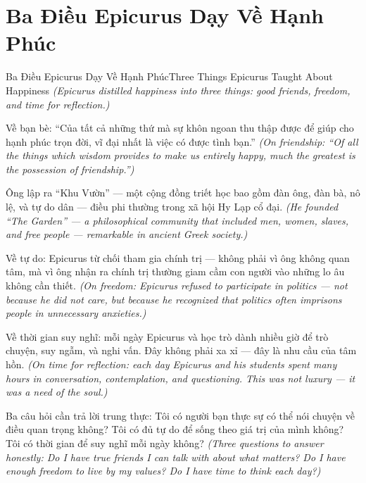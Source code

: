 \section{Ba Điều Epicurus Dạy Về Hạnh Phúc}
\begin{truyen}{Ba Điều Epicurus Dạy Về Hạnh Phúc}{Three Things Epicurus Taught About Happiness}
\textit{(Epicurus distilled happiness into three things: good friends, freedom, and time for reflection.)}

Về bạn bè: ``Của tất cả những thứ mà sự khôn ngoan thu thập được để giúp cho hạnh phúc trọn đời, vĩ đại nhất là việc có được tình bạn.''
\textit{(On friendship: ``Of all the things which wisdom provides to make us entirely happy, much the greatest is the possession of friendship.'')}

Ông lập ra ``Khu Vườn'' — một cộng đồng triết học bao gồm đàn ông, đàn bà, nô lệ, và tự do dân — điều phi thường trong xã hội Hy Lạp cổ đại.
\textit{(He founded ``The Garden'' — a philosophical community that included men, women, slaves, and free people — remarkable in ancient Greek society.)}

Về tự do: Epicurus từ chối tham gia chính trị — không phải vì ông không quan tâm, mà vì ông nhận ra chính trị thường giam cầm con người vào những lo âu không cần thiết.
\textit{(On freedom: Epicurus refused to participate in politics — not because he did not care, but because he recognized that politics often imprisons people in unnecessary anxieties.)}

Về thời gian suy nghĩ: mỗi ngày Epicurus và học trò dành nhiều giờ để trò chuyện, suy ngẫm, và nghi vấn. Đây không phải xa xỉ — đây là nhu cầu của tâm hồn.
\textit{(On time for reflection: each day Epicurus and his students spent many hours in conversation, contemplation, and questioning. This was not luxury — it was a need of the soul.)}

\end{truyen}

\begin{baihoc}
Ba câu hỏi cần trả lời trung thực: Tôi có người bạn thực sự có thể nói chuyện về điều quan trọng không? Tôi có đủ tự do để sống theo giá trị của mình không? Tôi có thời gian để suy nghĩ mỗi ngày không?
\textit{(Three questions to answer honestly: Do I have true friends I can talk with about what matters? Do I have enough freedom to live by my values? Do I have time to think each day?)}
\end{baihoc}
\ngancach

